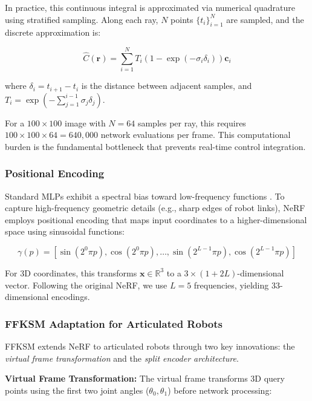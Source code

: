 \documentclass[12pt,a4paper,oneside]{report}
\begin{document}
In practice, this continuous integral is approximated via numerical quadrature using stratified sampling. Along each ray, $N$ points $\{t_i\}_{i=1}^N$ are sampled, and the discrete approximation is:

\begin{equation}
\hat{C}(\mathbf{r}) = \sum_{i=1}^{N} T_i (1 - \exp(-\sigma_i \delta_i)) \mathbf{c}_i
\end{equation}

where $\delta_i = t_{i+1} - t_i$ is the distance between adjacent samples, and $T_i = \exp\left(-\sum_{j=1}^{i-1} \sigma_j \delta_j\right)$.

For a $100 \times 100$ image with $N = 64$ samples per ray, this requires $100 \times 100 \times 64 = 640,000$ network evaluations per frame. This computational burden is the fundamental bottleneck that prevents real-time control integration.

\subsubsection{Positional Encoding}
\label{subsubsec:positional_encoding}

Standard MLPs exhibit a spectral bias toward low-frequency functions \cite{rahaman2019spectral}. To capture high-frequency geometric details (e.g., sharp edges of robot links), NeRF employs positional encoding that maps input coordinates to a higher-dimensional space using sinusoidal functions:

\begin{equation}
\gamma(p) = [\sin(2^0 \pi p), \cos(2^0 \pi p), \ldots, \sin(2^{L-1} \pi p), \cos(2^{L-1} \pi p)]
\end{equation}

For 3D coordinates, this transforms $\mathbf{x} \in \mathbb{R}^3$ to a $3 \times (1 + 2L)$-dimensional vector. Following the original NeRF, we use $L = 5$ frequencies, yielding 33-dimensional encodings.

\subsubsection{FFKSM Adaptation for Articulated Robots}
\label{subsubsec:ffksm_adaptation_for_articulated_robots}

FFKSM extends NeRF to articulated robots through two key innovations: the \textit{virtual frame transformation} and the \textit{split encoder architecture}.

\textbf{Virtual Frame Transformation:} The virtual frame transforms 3D query points using the first two joint angles ($\theta_0, \theta_1$) before network processing:
\end{document}
